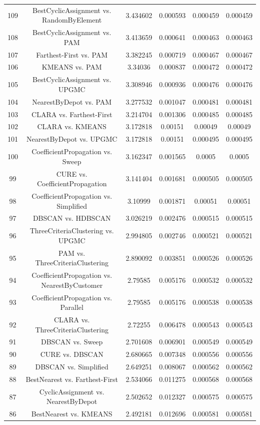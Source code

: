 \documentclass[a4paper,10pt]{article}
\begin{document}
\begin{landscape}
\begin{table}[!htp]
\begin{tabular}{cccccc}
109&BestCyclicAssignment vs. RandomByElement&3.434602&0.000593&0.000459&0.000459\\
108&BestCyclicAssignment vs. PAM&3.413659&0.000641&0.000463&0.000463\\
107&Farthest-First vs. PAM&3.382245&0.000719&0.000467&0.000467\\
106&KMEANS vs. PAM&3.34036&0.000837&0.000472&0.000472\\
105&BestCyclicAssignment vs. UPGMC&3.308946&0.000936&0.000476&0.000476\\
104&NearestByDepot vs. PAM&3.277532&0.001047&0.000481&0.000481\\
103&CLARA vs. Farthest-First&3.214704&0.001306&0.000485&0.000485\\
102&CLARA vs. KMEANS&3.172818&0.00151&0.00049&0.00049\\
101&NearestByDepot vs. UPGMC&3.172818&0.00151&0.000495&0.000495\\
100&CoefficientPropagation vs. Sweep&3.162347&0.001565&0.0005&0.0005\\
99&CURE vs. CoefficientPropagation&3.141404&0.001681&0.000505&0.000505\\
98&CoefficientPropagation vs. Simplified&3.10999&0.001871&0.00051&0.00051\\
97&DBSCAN vs. HDBSCAN&3.026219&0.002476&0.000515&0.000515\\
96&ThreeCriteriaClustering vs. UPGMC&2.994805&0.002746&0.000521&0.000521\\
95&PAM vs. ThreeCriteriaClustering&2.890092&0.003851&0.000526&0.000526\\
94&CoefficientPropagation vs. NearestByCustomer&2.79585&0.005176&0.000532&0.000532\\
93&CoefficientPropagation vs. Parallel&2.79585&0.005176&0.000538&0.000538\\
92&CLARA vs. ThreeCriteriaClustering&2.72255&0.006478&0.000543&0.000543\\
91&DBSCAN vs. Sweep&2.701608&0.006901&0.000549&0.000549\\
90&CURE vs. DBSCAN&2.680665&0.007348&0.000556&0.000556\\
89&DBSCAN vs. Simplified&2.649251&0.008067&0.000562&0.000562\\
88&BestNearest vs. Farthest-First&2.534066&0.011275&0.000568&0.000568\\
87&CyclicAssignment vs. NearestByDepot&2.502652&0.012327&0.000575&0.000575\\
86&BestNearest vs. KMEANS&2.492181&0.012696&0.000581&0.000581\\

\end{tabular}
\end{table}
\end{landscape}
\end{document}
